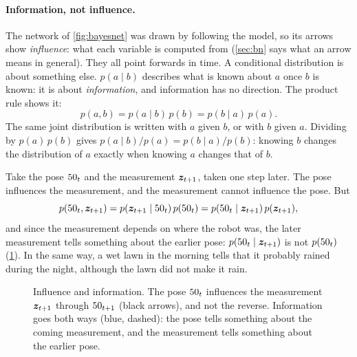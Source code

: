 \paragraph{Information, not influence.} The network of
\cref{fig:bayesnet} was drawn by following the model, so its arrows show
\emph{influence}: what each variable is computed from (\cref{sec:bn} says
what an arrow means in general). They all point forwards in time. A conditional distribution is about
something else. $p(a\mid b)$ describes what is known about $a$ once $b$ is
known: it is about \emph{information}, and information has no direction.
The product rule shows it:
\[
  p(a,b)=p(a\mid b)\,p(b)=p(b\mid a)\,p(a).
\]
The same joint distribution is written with $a$ given $b$, or with $b$ given
$a$. Dividing by $p(a)\,p(b)$ gives $p(a\mid b)/p(a)=p(b\mid a)/p(b)$:
knowing $b$ changes the distribution of $a$ exactly when knowing $a$
changes that of $b$.

Take the pose $50_t$ and the measurement $\bm{z}_{t+1}$, taken one step later.
The pose influences the measurement, and the measurement cannot influence
the pose. But
\[
  p(50_t,\bm{z}_{t+1})=p(\bm{z}_{t+1}\mid50_t)\,p(50_t)
  =p(50_t\mid\bm{z}_{t+1})\,p(\bm{z}_{t+1}),
\]
and since the measurement depends on where the robot was, the later
measurement tells something about the earlier pose:
$p(50_t\mid\bm{z}_{t+1})$ is not $p(50_t)$ (\cref{fig:infoflow}). In the same
way, a wet lawn in the morning tells that it probably rained during the
night, although the lawn did not make it rain.

\begin{figure}[ht]
\centering
{}
\caption{Influence and information. The pose $50_t$ influences the
measurement $\bm{z}_{t+1}$ through $50_{t+1}$ (black arrows), and not the
reverse. Information goes both ways (blue, dashed): the pose tells
something about the coming measurement, and the measurement tells
something about the earlier pose.}
\label{fig:infoflow}
\end{figure}

